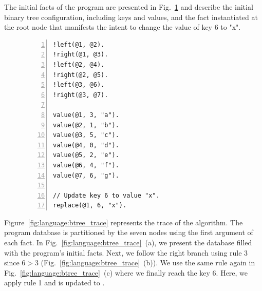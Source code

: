 The initial facts of the program are presented in
Fig.~\ref{code:language:btree_replace_initial} and describe the initial binary
tree configuration, including keys and values, and the  fact instantiated at the root node  that manifests the intent to
change the value of key 6 to "x".

\begin{figure}[ht]
\begin{Verbatim}[numbers=left,fontsize=\codesize,commandchars=\*\{\}]
!left(@1, @2).
!right(@1, @3).
!left(@2, @4).
!right(@2, @5). 
!left(@3, @6).
!right(@3, @7).

value(@1, 3, "a").
value(@2, 1, "b").
value(@3, 5, "c").
value(@4, 0, "d").
value(@5, 2, "e").
value(@6, 4, "f").
value(@7, 6, "g").

// Update key 6 to value "x".
replace(@1, 6, "x").
\end{Verbatim}
\label{code:language:btree_replace_initial}
\end{figure}

Figure~\ref{fig:language:btree_trace} represents the trace of the algorithm. The program
database is partitioned by the seven nodes using the first argument of each
fact. In Fig.~\ref{fig:language:btree_trace}~(a), we present the database filled with the
program's initial facts. Next, we follow the right branch using rule 3 since $6
> 3$ (Fig.~\ref{fig:language:btree_trace}~(b)).  We use the same rule again in
Fig.~\ref{fig:language:btree_trace}~(c) where we finally reach the key 6. Here, we apply
rule 1 and  is updated to .

